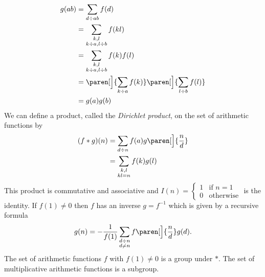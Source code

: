 \begin{align*}
g(ab) &= \sum_{d\div ab}f(d) \\
&= \sum_{\substack{k,l\\k\div a,l\div b}}f(kl) \\
&= \sum_{\substack{k,l\\k\div a,l\div b}}f(k)f(l) \\
&= \paren[\Big]{\sum_{k\div a}f(k)}\paren[\Big]{\sum_{l\div b}f(l)} \\
&= g(a) g(b)
\end{align*}
\remark We can define a product, called the \emph{Dirichlet product}, on the set of arithmetic functions by
\begin{align*}
(f*g)(n) &= \sum_{d\div n}f(a)g\paren[\Big]{\frac nd} \\
&= \sum_{\substack{k,l\\kl=n}}f(k)g(l)
\end{align*}
This product is commutative and associative and $I(n)=\begin{cases}
1 & \text{if $n=1$} \\
0 & \text{otherwise}
\end{cases}$ is the identity.  If $f(1)\neq0$ then $f$ has an inverse $g=f^{-1}$ which is given by a recursive formula
\[ g(n) = -\frac{1}{f(1)}\sum_{\substack{d\div n\\d\neq n}}f\paren[\Big]{\frac nd}g(d) . \] %
The set of arithmetic functions $f$ with $f(1)\neq0$ is a group under $*$. %
The set of multiplicative arithmetic functions is a subgroup.

